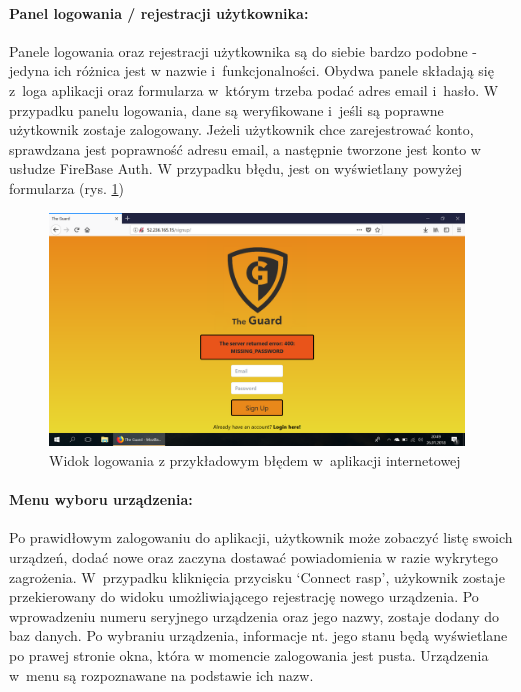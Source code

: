 \paragraph{Panel logowania / rejestracji użytkownika:} Panele logowania oraz rejestracji użytkownika są do siebie bardzo podobne - jedyna ich różnica jest w nazwie i~funkcjonalności. Obydwa panele składają się z~loga aplikacji oraz formularza w~którym trzeba podać adres email i~hasło. W przypadku panelu logowania, dane są weryfikowane i~jeśli są poprawne użytkownik zostaje zalogowany. Jeżeli użytkownik chce zarejestrować konto, sprawdzana jest poprawność adresu email, a następnie tworzone jest konto w usłudze FireBase Auth. W przypadku błędu, jest on wyświetlany powyżej formularza (rys. \ref{web_login_err})
\begin{figure}[H]
	\centering
	\includegraphics[width=11cm]{web_screenshots/error.png}
	\caption{Widok logowania z przykładowym błędem w~aplikacji internetowej}
	\label{web_login_err}
\end{figure}

\paragraph{Menu wyboru urządzenia:} Po prawidłowym zalogowaniu do aplikacji, użytkownik może zobaczyć listę swoich urządzeń, dodać nowe oraz zaczyna dostawać powiadomienia w razie wykrytego zagrożenia. W~przypadku kliknięcia przycisku `Connect rasp', użykownik zostaje przekierowany do widoku umożliwiającego rejestrację nowego urządzenia. Po wprowadzeniu numeru seryjnego urządzenia oraz jego nazwy, zostaje dodany do baz danych. Po wybraniu urządzenia, informacje nt. jego stanu będą wyświetlane po prawej stronie okna, która w momencie zalogowania jest pusta. Urządzenia w~menu są rozpoznawane na podstawie ich nazw. 

